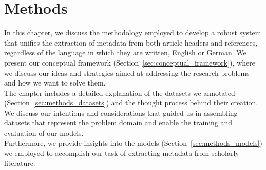 \chapter{Methods}\label{chap:methods}
In this chapter, we discuss the methodology employed to develop a robust system that unifies the extraction of metadata from both article headers and references, regardless of the language in which they are written, English or German. We present our conceptual framework (Section~\ref{sec:conceptual_framework}), where we discuss our ideas and strategies aimed at addressing the research problems and how we want to solve them.\\
The chapter includes a detailed explanation of the datasets we annotated (Section~\ref{sec:methods_datasets}) and the thought process behind their creation. We discuss our intentions and considerations that guided us in assembling datasets that represent the problem domain and enable the training and evaluation of our models.\\
Furthermore, we provide insights into the models (Section~\ref{sec:methods_models}) we employed to accomplish our task of extracting metadata from scholarly literature.

